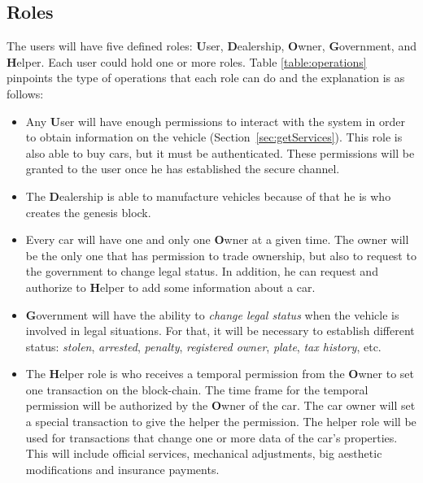 \subsection{Roles}

The users will have five defined roles: 
\textbf{U}ser,
\textbf{D}ealership,
\textbf{O}wner,
\textbf{G}overnment, and
\textbf{H}elper.
Each user could hold one or more roles.
Table \ref{table:operations} pinpoints the type of operations that each role can do and the explanation
is as follows: 
\begin{itemize}
    \item Any \textbf{U}ser will have enough permissions to interact with the system in order to 
        obtain information on the vehicle (Section~\ref{sec:getServices}). This role is also able 
        to buy cars, but it must be authenticated. 
        These permissions will be granted to the user once he has established the secure channel. 
    \item The \textbf{D}ealership is able to manufacture vehicles because of that he is who creates the 
        genesis block.
    \item Every car will have one and only one \textbf{O}wner at a given time. The owner will be the only one 
        that has permission to trade ownership, but also to request to the government to change legal
        status. In addition, he can request and authorize to \textbf{H}elper to add some information 
        about a car.
    \item \textbf{G}overnment will have the ability to  \textit{change legal status} when the 
        vehicle is involved in legal situations. For that, it will be necessary to establish 
        different status: \textit{stolen}, \textit{arrested}, \textit{penalty}, \textit{registered owner}, \textit{plate}, 
        \textit{tax history}, etc.
    \item The \textbf{H}elper role is who receives a temporal permission from the \textbf{O}wner to set one 
        transaction on the block-chain. The time frame for the temporal permission will be authorized by 
        the \textbf{O}wner of the car. The car owner will set a special transaction to give the helper 
        the permission. The helper role will be used for transactions that change one or more data of the 
        car's properties. This will include official services, mechanical adjustments, big aesthetic 
        modifications and insurance payments.
\end{itemize}

